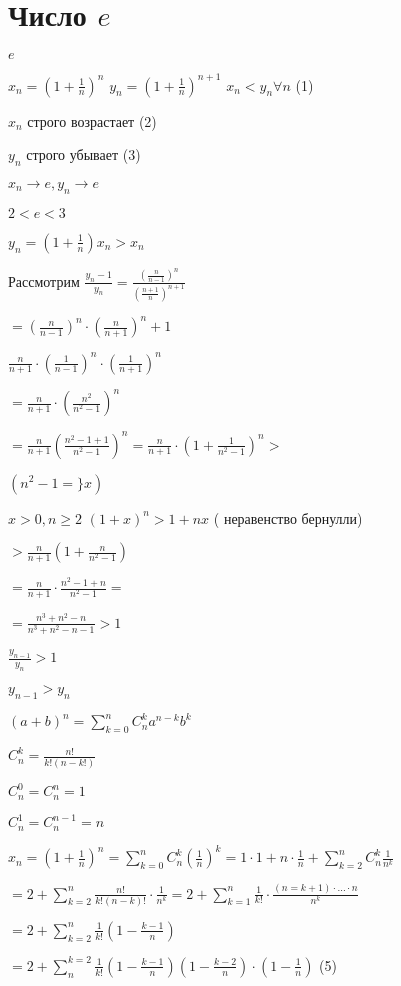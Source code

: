 \section{Число $e$}

$e$

$x_n = (1 + \frac{1}{n})^n$
$y_n = (1 + \frac{1}{n})^{n+1}$
$x_n < y_n \forall n $ (1)

$x_n$ строго возрастает (2)

$y_n$ строго убывает (3)

$x_n \to e, y_n \to e$

$2 < e < 3$

$y_n = (1 + \frac{1}{n}) x_n > x_n$

Рассмотрим $\frac{y_n - 1}{y_{n}} = \frac{(\frac{n}{n-1})^n}{(\frac{n+1}{n})^{n + 1}}$

$= (\frac{n}{n-1})^n \cdot (\frac{n}{n+ 1})^n + 1$

$\frac{n}{n + 1} \cdot (\frac{1}{n-1})^ n \cdot (\frac{1}{n+1})^ n$

$= \frac{n}{n + 1} \cdot (\frac{n^2}{n^2 - 1})^n$

$= \frac{n}{n+1} (\frac{n^2 - 1 + 1}{n^2 - 1})^n = \frac{n}{n+1} \cdot (1 + \frac{1}{n^2 - 1})^n >$

$(n^2 - 1 =\} x)$

$x> 0, n \geq 2$
$(1 + x)^n > 1 + nx$ ( неравенство бернулли)

$> \frac{n}{n + 1} (1 + \frac{n}{n^2 - 1})$

$= \frac{n}{n+1} \cdot \frac{n^2 - 1 + n}{n^2 - 1} = $

$= \frac{n^3 + n^2 - n}{n^3 + n^2 - n - 1} > 1$

$\frac{y_{n-1}}{y_n} > 1$

$y_{n-1} > y_n$

$(a + b)^n = \sum_{k = 0}^{n} C_n^k a^{n-k} b^k$

$C_n^k = \frac{n!}{k!(n-k!)}$

$C_n^0 = C_n^n = 1$

$C_n^1 = C_n^{n-1} = n$

$x_n = (1 + \frac{1}{n})^n = \sum_{k = 0}^{n} C_n^k (\frac{1}{n})^k = 1 \cdot 1 + n \cdot \frac{1}{n} + \sum_{k = 2}^{n} C_n^k \frac{1}{n^k}$

$= 2 + \sum_{k = 2}^{n} \frac{n!}{k!(n-k)!} \cdot \frac{1}{n^k} = 2 + \sum_{k = 1}^{n} \frac{1}{k!} \cdot \frac{(n=k+1) \cdot ... \cdot n }{n^k}$

$ = 2 + \sum_{k = 2}^{n} \frac{1}{k!} (1 - \frac{k - 1}{n})$

$= 2 + \sum_{n}^{k = 2} \frac{1}{k!} (1 - \frac{k - 1}{n})(1 - \frac{k - 2}{n})\cdot (1 - \frac{1}{n})$ (5)



